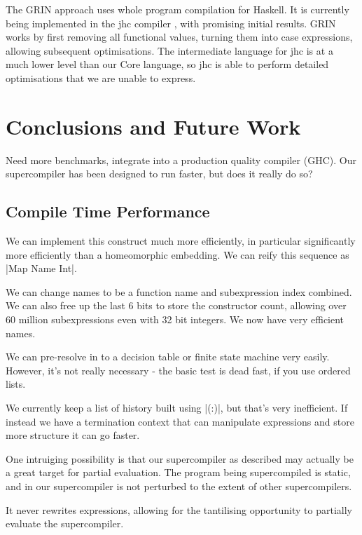 \documentclass[draft]{sigplanconf}
\begin{document}
The GRIN approach \cite{grin} uses whole program compilation for Haskell. It is currently being implemented in the jhc compiler \cite{jhc}, with promising initial results. GRIN works by first removing all functional values, turning them into case expressions, allowing subsequent optimisations. The intermediate language for jhc is at a much lower level than our Core language, so jhc is able to perform detailed optimisations that we are unable to express.

\section{Conclusions and Future Work}


Need more benchmarks, integrate into a production quality compiler (GHC). Our supercompiler has been designed to run faster, but does it really do so?

\subsection{Compile Time Performance}

We can implement this construct much more efficiently, in particular significantly more efficiently than a homeomorphic embedding. We can reify this sequence as |Map Name Int|.

We can change names to be a function name and subexpression index combined. We can also free up the last 6 bits to store the constructor count, allowing over 60 million subexpressions even with 32 bit integers. We now have very efficient names.

We can pre-resolve in to a decision table or finite state machine very easily. However, it's not really necessary - the basic test is dead fast, if you use ordered lists.

We currently keep a list of history built using |(:)|, but that's very inefficient. If instead we have a termination context that can manipulate expressions and store more structure it can go faster.

One intruiging possibility is that our supercompiler as described may actually be a great target for partial evaluation. The program being supercompiled is static, and in our supercompiler is not perturbed to the extent of other supercompilers.

It never rewrites expressions, allowing for the tantilising opportunity to partially evaluate the supercompiler.
\end{document}
